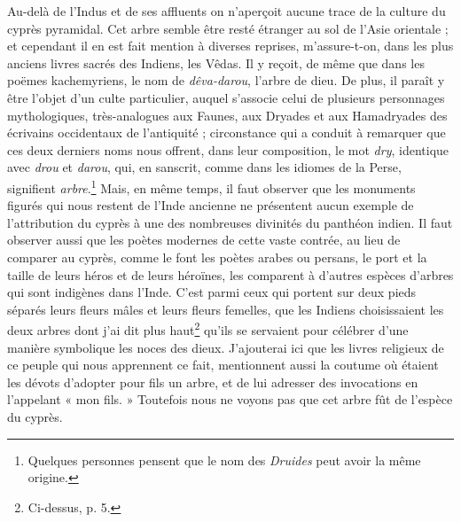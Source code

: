 \documentclass[a4paper, 11pt, oneside, polutonikogreek, french]{article}
\begin{document}
Au-delà de l'Indus et de ses affluents on n'aperçoit aucune trace de la culture du cyprès pyramidal. Cet arbre semble être resté étranger au sol de l'Asie orientale ; et cependant il en est fait mention à diverses reprises, m'assure-t-on, dans les plus anciens livres sacrés des Indiens, les Vêdas. Il y reçoit, de même que dans les poëmes kachemyriens, le nom de \emph{dêva-darou}, l'arbre de dieu. De plus, il paraît y être l'objet d'un culte particulier, auquel s'associe celui de plusieurs personnages mythologiques, très-analogues aux Faunes, aux Dryades et aux Hamadryades des écrivains occidentaux de l'antiquité ; circonstance qui a conduit à remarquer que ces deux derniers noms nous offrent, dans leur composition, le mot \emph{dry}, identique avec \emph{drou} et \emph{darou}, qui, en sanscrit, comme dans les idiomes de la Perse, signifient \emph{arbre}.\footnote{Quelques personnes pensent que le nom des \emph{Druides} peut avoir la même origine.} Mais, en même temps, il faut observer que les monuments figurés qui nous restent de l'Inde ancienne ne présentent aucun exemple de l'attribution du cyprès à une des nombreuses divinités du panthéon indien. Il faut observer aussi que les poètes modernes de cette vaste contrée, au lieu de comparer au cyprès, comme le font les poètes arabes ou persans, le port et la taille de leurs héros et de leurs héroïnes, les comparent à d'autres espèces d'arbres qui sont indigènes dans l'Inde. C'est parmi ceux qui portent sur deux pieds séparés leurs fleurs mâles et leurs fleurs femelles, que les Indiens choisissaient les deux arbres dont j'ai dit plus haut\footnote{Ci-dessus, p. 5.} qu'ils se servaient pour célébrer d'une manière symbolique les noces des dieux. J'ajouterai ici que les livres religieux de ce peuple qui nous apprennent ce fait, mentionnent aussi la coutume où étaient les dévots d'adopter pour fils un arbre, et de lui adresser des invocations en l'appelant « mon fils. » Toutefois nous ne voyons pas que cet arbre fût de l'espèce du cyprès.
\end{document}
